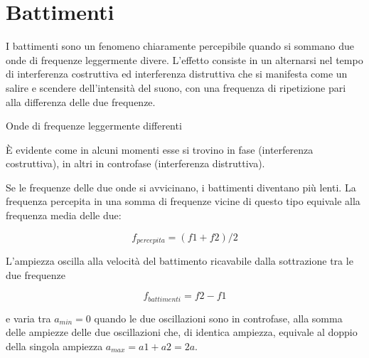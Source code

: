 %
%
%

\clearpage

\section{Battimenti}

I battimenti sono un fenomeno chiaramente percepibile quando si sommano due onde
di frequenze leggermente divere. L'effetto consiste in
un alternarsi nel tempo di interferenza costruttiva ed interferenza distruttiva
che si manifesta come un salire e scendere dell'intensità del suono, con una
frequenza di ripetizione pari alla differenza delle due frequenze.

Onde di frequenze leggermente differenti



È evidente come in alcuni momenti esse si trovino in fase (interferenza costruttiva),
in altri in controfase (interferenza distruttiva).



Se le frequenze delle due onde si avvicinano, i battimenti diventano più lenti.
La frequenza percepita in una somma di frequenze vicine di questo tipo equivale
alla frequenza media delle due:

\begin{equation}
  \label{freqper}
  f_{percepita} = (f1 + f2) / 2
\end{equation}

L'ampiezza oscilla alla velocità del battimento ricavabile dalla sottrazione tra le due frequenze

\begin{equation}
  \label{frqbat}
  f_{battimenti} = f2 - f1
\end{equation}

e varia tra $a_{min} = 0$ quando le due oscillazioni sono in controfase,
alla somma delle ampiezze delle due oscillazioni che, di identica ampiezza,
equivale al doppio della singola ampiezza $a_{max} = a1 + a2 = 2a$.

\clearpage
